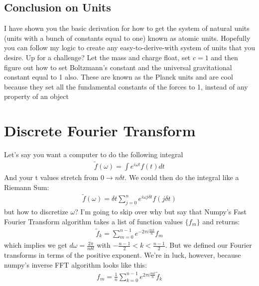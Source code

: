 \subsection{Conclusion on Units}
I have shown you the basic derivation for how to get the system of natural units (units with a bunch of constants equal to one)  known as atomic units.  Hopefully you can follow my logic to create any easy-to-derive-with system of units that you desire.  Up for a challenge?  Let the mass and charge float, set $c=1$ and then figure out how to set Boltzmann's constant and the universal gravitational constant equal to 1 also.  These are known as the Planck units and are cool because they set all the fundamental constants of the forces to 1, instead of any property of an object








\section{Discrete Fourier Transform}
Let's say you want a computer to do the following integral
\begin{align}
	\tilde{f} (\omega) = \int e^{i \omega t} f(t) dt
\end{align}
And your t values stretch from $0\rightarrow n \delta t$.  We could then do the integral like a Riemann Sum:
\begin{align}
	\tilde{f} (\omega) = \delta t \sum_{j=0}^{n}  e^{i \omega j \delta t} f( j \delta t )
\end{align}
but how to discretize $\omega$?  I'm going to skip over why but say that Numpy's Fast Fourier Transform algorithm takes a list of function values $\{f_m\}$ and returns:
\begin{align}
	\tilde{f}_k = \sum_{m=0}^{n - 1}  e^{- 2 \pi i \frac{m k}{n}} f_m
\end{align}
which implies we get $d\omega = \frac{ 2 \pi }{n \delta t}$ with $-\frac{n-1}{2} < k < \frac{n-1}{2} $.  But we defined our Fourier transforms in terms of the positive exponent.  We're in luck, however, because numpy's inverse FFT algorithm looks like this:
\begin{align}
	 f_m = \frac{1}{n} \sum_{k=0}^{n - 1}  e^{2 \pi i \frac{m k}{n}} \tilde{f}_k
\end{align}



